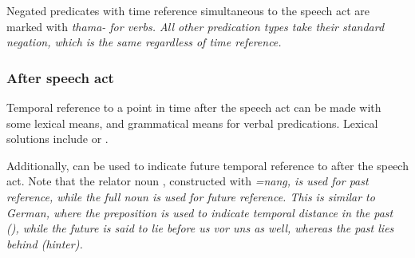 Negated predicates with time reference simultaneous to the speech act are marked with \em thama- \em {}  for verbs. All other predication types take their standard negation, which is the same regardless of time reference.




\subsubsection{After speech act}\label{sec:func:Afterspeechact}
Temporal reference to a point in time after the speech act can be made with some lexical means, and grammatical means for verbal predications. Lexical solutions include  or .




Additionally,  can be used to indicate future temporal reference to after the speech act. Note that the relator noun , constructed with \em =nang\em, is used for past reference, while the full noun   is used for future reference. This is similar to German, where the preposition  is used to indicate   temporal distance in the past (), while the future is said to lie before us \em vor uns \em as well, whereas the past lies behind (\em hinter\em).


